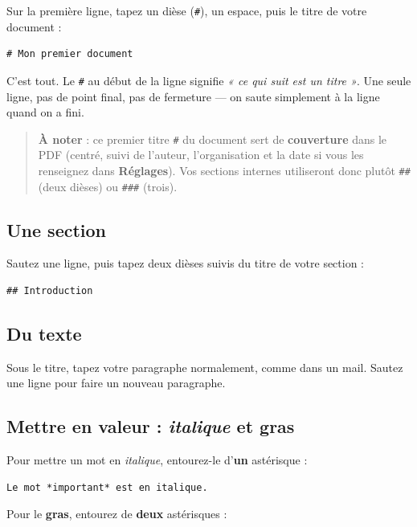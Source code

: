 \documentclass[11pt,a4paper]{article}
\theoremstyle{definition}
\begin{document}
Sur la première ligne, tapez un dièse (\texttt{\#}), un espace, puis le titre
de votre document :


\begin{lstlisting}
# Mon premier document
\end{lstlisting}


C'est tout. Le \texttt{\#} au début de la ligne signifie \emph{« ce qui suit est
un titre »}. Une seule ligne, pas de point final, pas de fermeture —
on saute simplement à la ligne quand on a fini.


\begin{quote}
\textbf{À noter} : ce premier titre \texttt{\#} du document sert de \textbf{couverture}
dans le PDF (centré, suivi de l'auteur, l'organisation et la date si
vous les renseignez dans \textbf{Réglages}). Vos sections internes
utiliseront donc plutôt \texttt{\#\#} (deux dièses) ou \texttt{\#\#\#} (trois).
\end{quote}


\subsection{Une section}

Sautez une ligne, puis tapez deux dièses suivis du titre de votre
section :


\begin{lstlisting}
## Introduction
\end{lstlisting}


\subsection{Du texte}

Sous le titre, tapez votre paragraphe normalement, comme dans un mail.
Sautez une ligne pour faire un nouveau paragraphe.


\subsection{Mettre en valeur : \emph{italique} et \textbf{gras}}

Pour mettre un mot en \emph{italique}, entourez-le d'\textbf{un} astérisque :


\begin{lstlisting}
Le mot *important* est en italique.
\end{lstlisting}


Pour le \textbf{gras}, entourez de \textbf{deux} astérisques :
\end{document}
